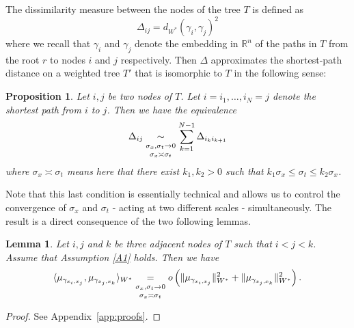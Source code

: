 \documentclass[pdflatex,sn-mathphys-num]{sn-jnl}%
\theoremstyle{thmstyleone}%
\newtheorem{proposition}[theorem]{Proposition}%
\newtheorem{lemma}{Lemma}
\theoremstyle{thmstyletwo}%
\theoremstyle{thmstylethree}%
\newcommand{\bR}{\mathbb R}
\begin{document}
The dissimilarity measure between the nodes of the tree $T$ is defined as
\begin{equation*}
    \Delta_{ij} = d_{W^\ast}(\gamma_i, \gamma_j)^2
\end{equation*}
    where we recall that $\gamma_i$ and $\gamma_j$ denote the embedding in $\bR^n$ of the paths in $T$ from the root $r$ to nodes $i$ and $j$ respectively. Then $\Delta$ approximates the shortest-path distance on a weighted tree $T'$ that is isomorphic to $T$ in the following sense:
\begin{proposition}
    \label{prop:shortest_path_distance}
    Let $i, j$ be two nodes of $T$. Let $i=i_1,\dots,i_N=j$ denote the shortest path from $i$ to $j$. Then we have the equivalence
\begin{equation}
    \Delta_{ij} \underset{\substack{\vspace{.05cm} \\ \sigma_x, \sigma_t \to 0 \vspace{.1cm} \\ \sigma_x \asymp \sigma_t}}{\sim} \sum_{k=1}^{N-1}\Delta_{i_k i_{k+1}}
\end{equation}
    where $\sigma_x \asymp \sigma_t$ means here that there exist $k_1, k_2 > 0$ such that $k_1 \sigma_x \leq \sigma_t \leq k_2 \sigma_x$.
\end{proposition}
    \noindent Note that this last condition is essentially technical and allows us to control the convergence of $\sigma_x$ and $\sigma_t$ - acting at two different scales - simultaneously. The result is a direct consequence of the two following lemmas.
\begin{lemma}\label{lemma:1}
    Let $i, j$ and $k$ be three adjacent nodes of $T$ such that $i < j < k$. Assume that Assumption \ref{A1} holds. Then we have
\begin{equation}
    \label{eq:L1}
    \langle \mu_{\gamma_{x_i, x_j}}, \mu_{\gamma_{x_j, x_k}}\rangle_{W^\ast} \underset{\substack{\vspace{.05cm} \\ \sigma_x, \sigma_t \to 0 \vspace{.1cm} \\ \sigma_x \asymp \sigma_t}}{=} o\left(\|\mu_{\gamma_{x_i, x_j}}\|_{W^\ast}^2 + \|\mu_{\gamma_{x_j, x_k}}\|_{W^\ast}^2\right).
\end{equation}
\end{lemma}
\begin{proof}
    See Appendix~\ref{app:proofs}.
\end{proof}
\end{document}
